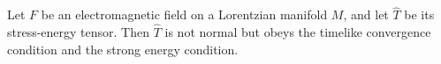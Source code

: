 Let $F$ be an electromagnetic field on a Lorentzian manifold $M$, and let $\hat{T}$ be its stress-energy tensor. Then $\hat{T}$ is not normal but obeys the timelike convergence condition and the strong energy condition.
